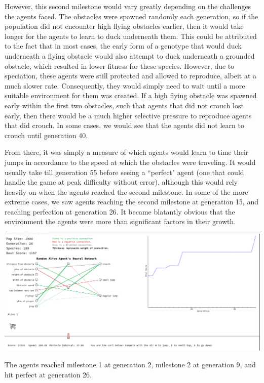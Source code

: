 \documentclass[12pt]{article}
\begin{document}
\begin{flushleft}
However, this second milestone would vary greatly depending on the challenges the agents faced. The obstacles were spawned randomly each generation, so if the population did not encounter high flying obstacles earlier, then it would take longer for the agents to learn to duck underneath them. This could be attributed to the fact that in most cases, the early form of a genotype that would duck underneath a flying obstacle would also attempt to duck underneath a grounded obstacle, which resulted in lower fitness for these species. However, due to speciation, these agents were still protected and allowed to reproduce, albeit at a much slower rate. Consequently, they would simply need to wait until a more suitable environment for them was created. If a high flying obstacle was spawned early within the first two obstacles, such that agents that did not crouch lost early, then there would be a much higher selective pressure to reproduce agents that did crouch. In some cases, we would see that the agents did not learn to crouch until generation 40.

From there, it was simply a measure of which agents would learn to time their jumps in accordance to the speed at which the obstacles were traveling. It would usually take till generation 55 before seeing a ``perfect" agent (one that could handle the game at peak difficulty without error), although this would rely heavily on when the agents reached the second milestone. In some of the more extreme cases, we saw agents reaching the second milestone at generation 15, and reaching perfection at generation 26. It became blatantly obvious that the environment the agents were more than significant factors in their growth.

\hfill

\noindent\includegraphics[scale=.4]{early_perfect.png}

The agents reached milestone 1 at generation 2, milestone 2 at generation 9, and hit perfect at generation 26.


\end{flushleft}
\end{document}
